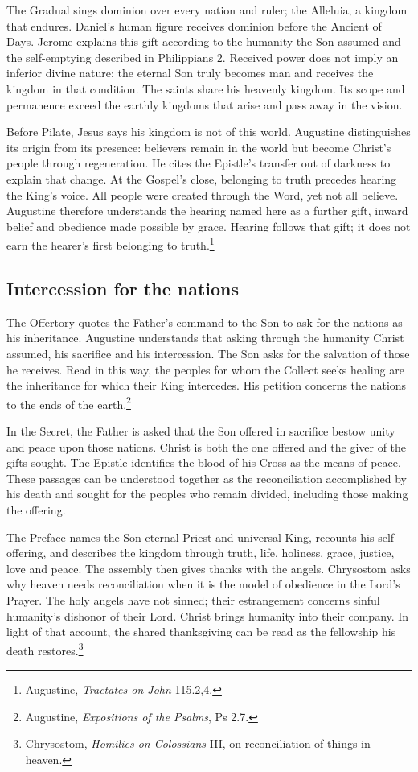 The Gradual sings dominion over every nation and ruler; the Alleluia, a kingdom that endures. Daniel's human figure receives dominion before the Ancient of Days. Jerome explains this gift according to the humanity the Son assumed and the self-emptying described in Philippians 2. Received power does not imply an inferior divine nature: the eternal Son truly becomes man and receives the kingdom in that condition. The saints share his heavenly kingdom. Its scope and permanence exceed the earthly kingdoms that arise and pass away in the vision.

Before Pilate, Jesus says his kingdom is not of this world. Augustine distinguishes its origin from its presence: believers remain in the world but become Christ's people through regeneration. He cites the Epistle's transfer out of darkness to explain that change. At the Gospel's close, belonging to truth precedes hearing the King's voice. All people were created through the Word, yet not all believe. Augustine therefore understands the hearing named here as a further gift, inward belief and obedience made possible by grace. Hearing follows that gift; it does not earn the hearer's first belonging to truth.\footnote{Augustine, \emph{Tractates on John} 115.2,4.}

\clearpage
\subsection{Intercession for the nations}
The Offertory quotes the Father's command to the Son to ask for the nations as his inheritance. Augustine understands that asking through the humanity Christ assumed, his sacrifice and his intercession. The Son asks for the salvation of those he receives. Read in this way, the peoples for whom the Collect seeks healing are the inheritance for which their King intercedes. His petition concerns the nations to the ends of the earth.\footnote{Augustine, \emph{Expositions of the Psalms}, Ps 2.7.}

In the Secret, the Father is asked that the Son offered in sacrifice bestow unity and peace upon those nations. Christ is both the one offered and the giver of the gifts sought. The Epistle identifies the blood of his Cross as the means of peace. These passages can be understood together as the reconciliation accomplished by his death and sought for the peoples who remain divided, including those making the offering.

The Preface names the Son eternal Priest and universal King, recounts his self-offering, and describes the kingdom through truth, life, holiness, grace, justice, love and peace. The assembly then gives thanks with the angels. Chrysostom asks why heaven needs reconciliation when it is the model of obedience in the Lord's Prayer. The holy angels have not sinned; their estrangement concerns sinful humanity's dishonor of their Lord. Christ brings humanity into their company. In light of that account, the shared thanksgiving can be read as the fellowship his death restores.\footnote{Chrysostom, \emph{Homilies on Colossians} III, on reconciliation of things in heaven.}


